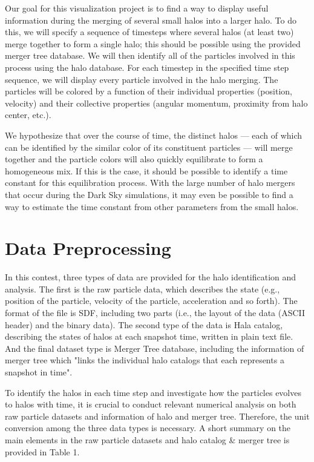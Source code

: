 \documentclass[12pt]{article}
\begin{document}
Our goal for this visualization project is to find a way to display useful
information during the merging of several small halos into a larger halo. To do
this, we will specify a sequence of timesteps where several halos (at least
two) merge together to form a single halo; this should be possible using the
provided merger tree database. We will then identify all of the particles
involved in this process using the halo database. For each timestep in the
specified time step sequence, we will display every particle involved in the
halo merging. The particles will be colored by a function of their individual
properties (position, velocity) and their collective properties (angular
momentum, proximity from halo center, etc.).

We hypothesize that over the course of time, the distinct halos --- each of
which can be identified by the similar color of its constituent particles ---
will merge together and the particle colors will also quickly equilibrate to
form a homogeneous mix. If this is the case, it should be possible to identify
a time constant for this equilibration process. With the large number of halo
mergers that occur during the Dark Sky simulations, it may even be possible to
find a way to estimate the time constant from other parameters from the small
halos.


\section{Data Preprocessing}

In this contest, three types of data are provided for the halo identification 
and analysis. The first is the raw particle data, which describes the state (e.g.,
position of the particle, velocity of the particle, acceleration and so forth).
The format of the file is SDF, including two parts (i.e., the layout of the data 
(ASCII header) and the binary data). The second type of the data is Hala catalog,
describing the states of halos at each snapshot time, written in plain text file. 
And the final dataset type is Merger Tree database, including the information of 
merger tree which "links the individual halo catalogs that each represents a snapshot 
in time". 

To identify the halos in each time step and investigate how the particles evolves to 
halos with time, it is crucial to conduct relevant numerical analysis on both raw 
particle datasets and information of halo and merger tree. Therefore, the unit conversion 
among the three data types is necessary. A short summary on the main elements in the 
raw particle datasets and halo catalog & merger tree is provided in Table 1.
\end{document}
